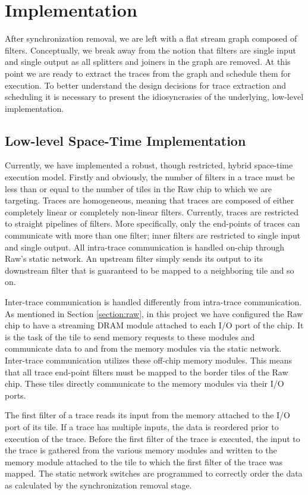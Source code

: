 \section{Implementation}
\label{sec:implementation}
After synchronization removal, we are left with a flat stream graph
composed of filters.  Conceptually, we break away from the notion that
filters are single input and single output as all splitters and
joiners in the graph are removed.  At this point we are ready to
extract the traces from the graph and schedule them for execution.  To
better understand the design decisions for trace extraction and
scheduling it is necessary to present the idiosyncrasies of the
underlying, low-level implementation.

\subsection{Low-level Space-Time Implementation}
Currently, we have implemented a robust, though restricted, hybrid
space-time execution model.  Firstly and obviously, the number of
filters in a trace must be less than or equal to the number of tiles
in the Raw chip to which we are targeting.  Traces are homogeneous,
meaning that traces are composed of either completely linear or
completely non-linear filters.  Currently, traces are restricted to
straight pipelines of filters.  More specifically, only the end-points
of traces can communicate with more than one filter; inner filters are
restricted to single input and single output.  All intra-trace
communication is handled on-chip through Raw's static network.  An
upstream filter simply sends its output to its downstream filter that
is guaranteed to be mapped to a neighboring tile and so on.

Inter-trace communication is handled differently from intra-trace
communication.  As mentioned in Section \ref{section:raw}, in this
project we have configured the Raw chip to have a streaming DRAM
module attached to each I/O port of the chip.  It is the task of the
tile to send memory requests to these modules and communicate data to
and from the memory modules via the static network.  Inter-trace
communication utilizes these off-chip memory modules.  This means that
all trace end-point filters must be mapped to the border tiles of the
Raw chip.  These tiles directly communicate to the memory modules via
their I/O ports.  

The first filter of a trace reads its input from the memory attached
to the I/O port of its tile.  If a trace has multiple inputs, the data
is reordered prior to execution of the trace.  Before the first filter
of the trace is executed, the input to the trace is gathered from the
various memory modules and written to the memory module attached to
the tile to which the first filter of the trace was mapped.  The
static network switches are programmed to correctly order the data as
calculated by the synchronization removal stage.

